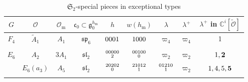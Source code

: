 \documentclass{amsart}
\theoremstyle{definition}
\newcommand{\C}{\mathbb{C}}
\newcommand{\m}{\mathrm{m}}
\newcommand{\0}{\mathcal{O}}
\begin{document}
	\begin{table}[htp] 
		\caption{$\mathfrak{S}_2$-special pieces in exceptional types}\label{S2table}
		\begin{center}
			\begin{tabular}{|c | c| c| c| c| c| c|c | c|} %
				\hline
				$G$ & $\0$ & $\0_\m$ & $\mathfrak{c}_0\subset {\mathfrak g}^{h_\m}_0$ & $h$ & $w(h_\m)$ 
                & $\lambda$ & $\lambda^+$ %
                & $\lambda^+$ in $\C^i[\widetilde{\0}]$\\ 
				\hline 
				
				$F_4$ & $\tilde{A}_1$ & $A_1$ & $\mathfrak{sp}_6$ & $\scriptsize{0001}$ & $\scriptsize{1000}$ 
                &  $\varpi_4$ & $\varpi_4$ 
                & 1\\
				
				\hline & & & & & & & & \\[-0.3cm]
				
				$E_6$ & $A_2$ & $3A_1$ & $\mathfrak{sl}_2$ & $\scriptsize{\begin{aligned}00 &000 \\[-1.8mm] &2\end{aligned}}$ & $\scriptsize{\begin{aligned}00 &100 \\[-1.8mm] &0\end{aligned}}$  
                & $\varpi_2$ & $\varpi_2$ 
                & $1,\bf{2}$  \\
                
				& $E_6(a_3)$ & $A_5$ & $\mathfrak{sl}_2$   
				& $\scriptsize{\begin{aligned}20 &202 \\[-1.8mm] &0\end{aligned}}$ & $\scriptsize{\begin{aligned}21 &012 \\[-1.8mm] &1\end{aligned}}$  
				& $\scriptsize{\begin{aligned}01 &210 \\[-1.8mm] &1\end{aligned}}$ & $\varpi_2$ 
                & $1,4, 5, \bf{5}$ \\
				
				\hline & & & & & & & &  \\[-0.3cm]
				

\end{tabular}
\end{center}
\end{table}
\end{document}
